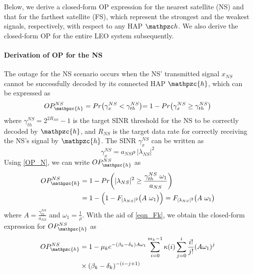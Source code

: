 \documentclass[letter,journal]{IEEEtran}
\newcommand*{\Resize}[2]{\resizebox{#1}{!}{$#2$}}%
\begin{document}
Below, we derive a closed-form OP expression for the nearest satellite (NS) and that for the farthest satellite (FS), which represent the strongest and the weakest signals, respectively, with respect to any HAP $\mathpzc h$. We also derive the closed-form OP for the entire LEO system subsequently.
\paragraph{\bf Derivation of OP for the NS} The outage for the NS scenario occurs when the NS' transmitted signal $x_{NS}$ cannot be successfully decoded by its connected HAP $\mathpzc{h}$, which can be expressed as\vspace{-0.09cm}
\begin{equation}\label{OP_n}
OP_{\mathpzc {h}}^{NS}= Pr\bigl(\gamma_{x}^{NS} < \gamma_{th}^{NS} \bigl)
= 1 - Pr\bigl( \gamma_{x}^{NS} \geq \gamma_{th}^{NS} \bigl)
\end{equation}
where $\gamma_{th}^{NS}=2^{2R_{NS}}-1$ is the target SINR threshold for the NS to be correctly decoded by $\mathpzc {h}$, and $R_{NS}$ is the target data rate for correctly receiving the NS's signal by $\mathpzc {h}$. The SINR $\gamma_{x}^{NS}$ can be written as\vspace{-0.1cm}
\begin{equation}\label{OP_N}
     \gamma_{x}^{NS}={{a_{NS}\rho}~|\lambda_{NS}|^2}
\end{equation}
Using \eqref{OP_N}, we can write $OP_{\mathpzc {h}}^{NS}$ as \vspace{-0.3cm}
\begin{align}
OP_{\mathpzc {h}}^{NS} &=1-Pr\biggl( |\lambda_{NS}|^2 \geq \frac{\gamma_{th}^{NS}~\omega_1}{a_{NS}} \biggl)\nonumber\\&
= 1 - \Big( 1-F_{|\lambda_{NS}|^2}\bigl(A~\omega_1\bigl)\Big)=\Resize{2.15cm}{F_{|\lambda_{NS}|^2}\bigl(A~\omega_1\bigl) }
\end{align}
where $A=\frac{\gamma_{th}^{NS}}{a_{NS}}$ and $\omega_1=\frac{1}{\rho}$. With the aid of \eqref{eqn_Fk}, we obtain the closed-form expression for $OP_{\mathpzc{h}}^{NS}$ as
\begin{align}\label{OP_NS}
        OP_{\mathpzc {h}}^{NS} &=1-\mu_k  e^{-(\beta_k-\delta_k)A\omega_1} \sum_{i=0}^{m_k-1} \kappa(i)\sum_{j=0}^i \frac{i!}{j!} (A \omega_1)^j \nonumber\\&  \times(\beta_k-\delta_k )^{-(i-j+1)} 
\end{align}
\end{document}
